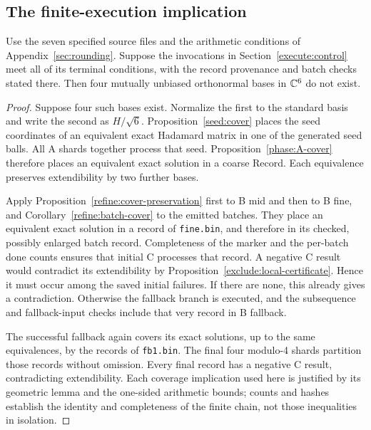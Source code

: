 \subsection{The finite-execution implication}
\label{execute:implication}

\begin{theorem}
\label{execute:finite-theorem}
Use the seven specified source files and the arithmetic conditions of
Appendix~\ref{sec:rounding}. Suppose the invocations in
Section~\ref{execute:control} meet all of its terminal conditions, with
the record provenance and batch checks stated there. Then four mutually
unbiased orthonormal bases in $\mathbb C^6$ do not exist.
\end{theorem}

\begin{proof}
Suppose four such bases exist. Normalize the first to the standard basis
and write the second as $H/\sqrt6$. Proposition~\ref{seed:cover} places
the seed coordinates of an equivalent exact Hadamard matrix in one of
the generated seed balls. All A shards together process that seed.
Proposition~\ref{phase:A-cover} therefore places an equivalent exact
solution in a coarse Record. Each equivalence preserves extendibility
by two further bases.

Apply Proposition~\ref{refine:cover-preservation} first to B mid and
then to B fine, and Corollary~\ref{refine:batch-cover} to the emitted
batches. They place
an equivalent exact solution in a record of \texttt{fine.bin}, and
therefore in its checked, possibly enlarged batch record. Completeness
of the marker and the per-batch done counts ensures that initial C
processes that record. A negative C result would contradict its
extendibility by Proposition~\ref{exclude:local-certificate}. Hence it
must occur among the saved initial failures. If there are none, this
already gives a contradiction. Otherwise the fallback branch is executed,
and the subsequence and fallback-input checks include that very record
in B fallback.

The successful fallback again covers its exact solutions, up to the
same equivalences, by the records of \texttt{fb1.bin}. The final four
modulo-4 shards partition those records without omission. Every final
record has a negative C result, contradicting extendibility. Each
coverage implication used here is justified by its geometric lemma and
the one-sided arithmetic bounds; counts and hashes establish the
identity and completeness of the finite chain, not those inequalities
in isolation.
\end{proof}

